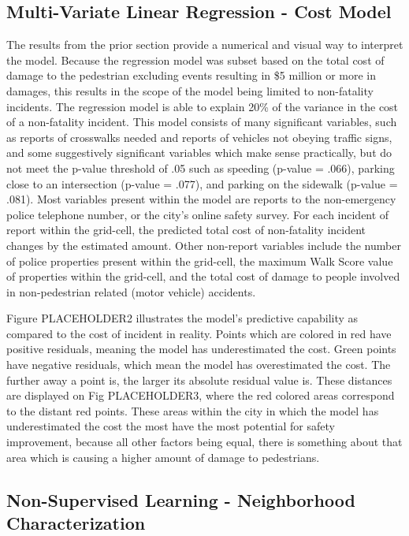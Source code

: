 \documentclass{llncs}
\begin{document}
\subsection{Multi-Variate Linear Regression - Cost Model}
The results from the prior section provide a numerical and visual way to interpret the model. Because the regression model was subset based on the total cost of damage to the pedestrian excluding events resulting in \$5 million or more in damages, this results in the scope of the model being limited to non-fatality incidents. The regression model is able to explain 20\% of the variance in the cost of a non-fatality incident. This model consists of many significant variables, such as reports of crosswalks needed and reports of vehicles not obeying traffic signs, and some suggestively significant variables which make sense practically, but do not meet the p-value threshold of .05 such as speeding (p-value = .066), parking close to an intersection (p-value = .077), and parking on the sidewalk (p-value = .081). Most variables present within the model are reports to the non-emergency police telephone number, or the city’s online safety survey. For each incident of report within the grid-cell, the predicted total cost of non-fatality incident changes by the estimated amount. Other non-report variables include the number of police properties present within the grid-cell, the maximum Walk Score value of properties within the grid-cell, and the total cost of damage to people involved in non-pedestrian related (motor vehicle) accidents. 

Figure PLACEHOLDER2 illustrates the model’s predictive capability as compared to the cost of incident in reality. Points which are colored in red have positive residuals, meaning the model has underestimated the cost. Green points have negative residuals, which mean the model has overestimated the cost. The further away a point is, the larger its absolute residual value is. These distances are displayed on Fig PLACEHOLDER3, where the red colored areas correspond to the distant red points. These areas within the city in which the model has underestimated the cost the most have the most potential for safety improvement, because all other factors being equal, there is something about that area which is causing a higher amount of damage to pedestrians.

\subsection{Non-Supervised Learning - Neighborhood Characterization}
\end{document}
